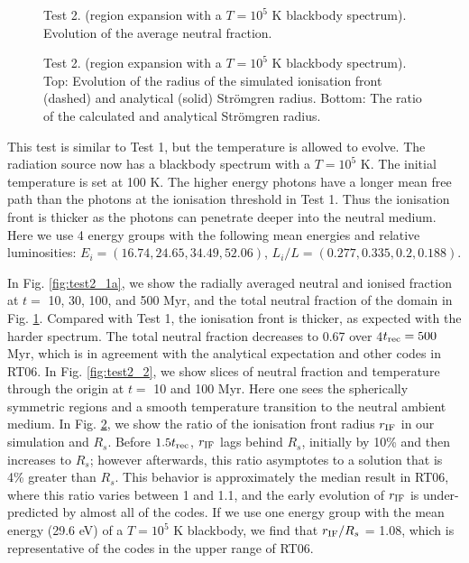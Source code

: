 \documentclass[useAMS,usenatbib]{mn2e}
\begin{document}
\begin{figure}
  \caption{\label{fig:test2_1b} Test 2. (\hii region expansion with a
    $T=10^5$ K blackbody spectrum).  Evolution of the average neutral
    fraction.}
\end{figure}

\begin{figure*}
  \caption{\label{fig:test2_2} Test 2. (\hii region expansion
    with a $T=10^5$ K blackbody spectrum).  Top: Slices through the
    origin of neutral fraction at 10 and 100 Myr.  Bottom: Slices of
    temperature at 10 and 100 Myr.}
\end{figure*}

\begin{figure}
  \caption{\label{fig:test2_3} Test 2. (\hii region expansion
    with a $T=10^5$ K blackbody spectrum).  Top: Evolution of the
    radius of the simulated ionisation front (dashed) and analytical
    (solid) Str\"{o}mgren radius.  Bottom: The ratio of the calculated
    and analytical Str\"{o}mgren radius.}
\end{figure}

This test is similar to Test 1, but the temperature is allowed to
evolve.  The radiation source now has a blackbody spectrum with a $T =
10^5$ K.  The initial temperature is set at 100 K.  The higher energy
photons have a longer mean free path than the photons at the
ionisation threshold in Test 1.  Thus the ionisation front is thicker
as the photons can penetrate deeper into the neutral medium.  Here we
use 4 energy groups with the following mean energies and relative
luminosities: $E_i = (16.74, 24.65, 34.49, 52.06)$, $L_i/L = (0.277,
0.335, 0.2, 0.188)$.

In Fig. \ref{fig:test2_1a}, we show the radially averaged neutral
and ionised fraction at $t = $ 10, 30, 100, and 500 Myr, and the total
neutral fraction of the domain in Fig. \ref{fig:test2_1b}.  Compared
with Test 1, the ionisation front is thicker, as expected with the
harder spectrum.  The total neutral fraction decreases to 0.67 over
4$t_{\rm rec} = 500$ Myr, which is in agreement with the analytical
expectation and other codes in RT06.  In Fig. \ref{fig:test2_2}, we
show slices of neutral fraction and temperature through the origin at
$t = $ 10 and 100 Myr.  Here one sees the spherically symmetric \hii
regions and a smooth temperature transition to the neutral ambient
medium.  In Fig. \ref{fig:test2_3}, we show the ratio of the
ionisation front radius $r_{\rm IF}$ in our simulation and $R_s$.
Before $1.5t_{\rm rec}$, $r_{\rm IF}$ lags behind $R_s$, initially by
10\% and then increases to $R_s$; however afterwards, this ratio
asymptotes to a solution that is 4\% greater than $R_s$.  This
behavior is approximately the median result in RT06, where this ratio
varies between 1 and 1.1, and the early evolution of $r_{\rm IF}$ is
under-predicted by almost all of the codes.  If we use one energy
group with the mean energy (29.6 eV) of a $T=10^5$ K blackbody, we
find that $r_{\rm IF}/R_s$ = 1.08, which is representative of the
codes in the upper range of RT06.
\end{document}
